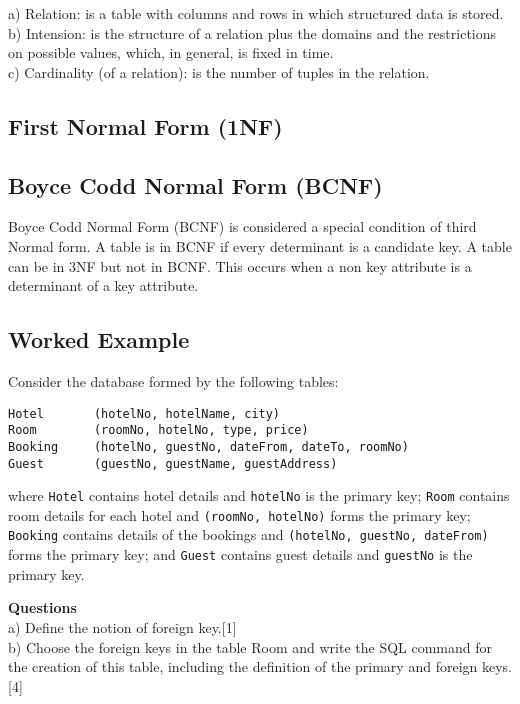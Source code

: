 \documentclass[]{article}
\begin{document}
a) Relation: is a table with columns and rows in which structured data is stored.\\
b) Intension: is the structure of a relation plus the domains and the restrictions on possible values, which, in general, is fixed in time.\\
c) Cardinality (of a relation):  is the number of tuples in the relation.


\subsection{First Normal Form (1NF) }

\subsection{Boyce Codd Normal Form (BCNF)}
Boyce Codd Normal Form (BCNF) is considered a special condition of third Normal form. A table is in BCNF if every determinant is a candidate key. A table can be in 3NF but  not in BCNF. This occurs when a non key attribute is a determinant of a key attribute.
\newpage
\subsection{Worked Example}
Consider the database formed by the following tables:

\begin{verbatim}
Hotel		(hotelNo, hotelName, city)
Room		(roomNo, hotelNo, type, price)
Booking		(hotelNo, guestNo, dateFrom, dateTo, roomNo)
Guest		(guestNo, guestName, guestAddress)
\end{verbatim}

where	\texttt{Hotel} contains hotel details and \texttt{hotelNo} is the primary key; \texttt{Room} contains room details for each hotel and \texttt{(roomNo, hotelNo)} forms the primary key; \texttt{Booking} contains details of the bookings and \texttt{(hotelNo, guestNo, dateFrom)} forms the primary key; and \texttt{Guest} contains guest details and \texttt{guestNo} is the primary key.

\textbf{Questions}\\
a) Define the notion of foreign key.[1]\\
b) Choose the foreign keys in the table Room and write the SQL command for the creation of this table, including the definition of the primary and foreign keys.[4] \\
\end{document}
